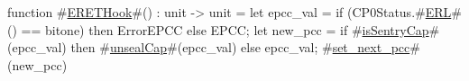 function #\hyperref[sailMIPSzERETHook]{ERETHook}#() : unit -> unit =
  {
    let epcc_val = if (CP0Status.#\hyperref[sailMIPSzERL]{ERL}#() == bitone) then ErrorEPCC else EPCC;
    let new_pcc = if #\hyperref[sailMIPSzisSentryCap]{isSentryCap}#(epcc_val) then #\hyperref[sailMIPSzunsealCap]{unsealCap}#(epcc_val) else epcc_val;
    #\hyperref[sailMIPSzsetzynextzypcc]{set\_next\_pcc}#(new_pcc)
  }
